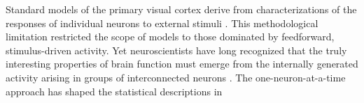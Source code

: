 Standard models of the primary visual cortex derive from characterizations of the responses of individual neurons to external stimuli \cite{Carandini:2004}. 
This methodological limitation restricted the scope of models to those dominated by feedforward, stimulus-driven activity. 
Yet neuroscientists have long recognized that the truly interesting properties of brain function must emerge from the internally generated activity arising in groups of interconnected neurons \cite{Yuste:2005}.
The one-neuron-at-a-time approach has shaped the statistical descriptions in  
